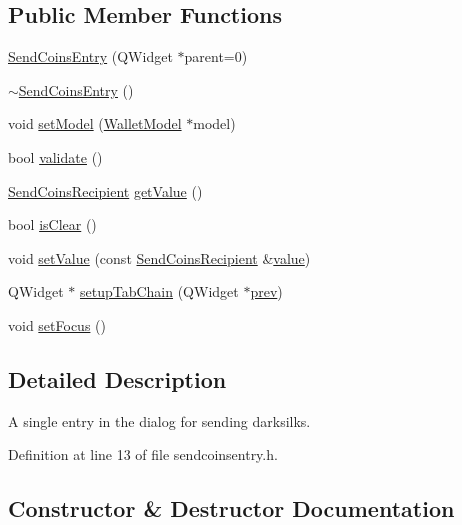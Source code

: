 \subsection*{Public Member Functions}
\begin{DoxyCompactItemize}
\item 
\hyperlink{class_send_coins_entry_a1c385963cf2dd2eb618720908988d037}{Send\+Coins\+Entry} (Q\+Widget $\ast$parent=0)
\item 
\hyperlink{class_send_coins_entry_a3a6d8d30176c7c79e3bc2af346d2a68b}{$\sim$\+Send\+Coins\+Entry} ()
\item 
void \hyperlink{class_send_coins_entry_a831f8f9a63acd77b7d66d5393e12310b}{set\+Model} (\hyperlink{class_wallet_model}{Wallet\+Model} $\ast$model)
\item 
bool \hyperlink{class_send_coins_entry_ab77df95fe77e9a001190cd4dabe0dfec}{validate} ()
\item 
\hyperlink{class_send_coins_recipient}{Send\+Coins\+Recipient} \hyperlink{class_send_coins_entry_af36fb0ed9e2e07079c1a982b31e793c8}{get\+Value} ()
\item 
bool \hyperlink{class_send_coins_entry_a1dcce9480364868dfd0bb8782e039e57}{is\+Clear} ()
\item 
void \hyperlink{class_send_coins_entry_a513dd22231d0d7c2550c5533e9518cf5}{set\+Value} (const \hyperlink{class_send_coins_recipient}{Send\+Coins\+Recipient} \&\hyperlink{cache_8cc_a0f61d63b009d0880a89c843bd50d8d76}{value})
\item 
Q\+Widget $\ast$ \hyperlink{class_send_coins_entry_aa431a0bf53174b3a012fe224e472bc13}{setup\+Tab\+Chain} (Q\+Widget $\ast$\hyperlink{cache_8cc_aabbd2f01bb8ec4a7a0128bce5f8cdb1b}{prev})
\item 
void \hyperlink{class_send_coins_entry_a0dcb8720f234165b37f8b45b035320cc}{set\+Focus} ()
\end{DoxyCompactItemize}


\subsection{Detailed Description}
A single entry in the dialog for sending darksilks. 

Definition at line 13 of file sendcoinsentry.\+h.



\subsection{Constructor \& Destructor Documentation}
\hypertarget{class_send_coins_entry_a1c385963cf2dd2eb618720908988d037}{}
